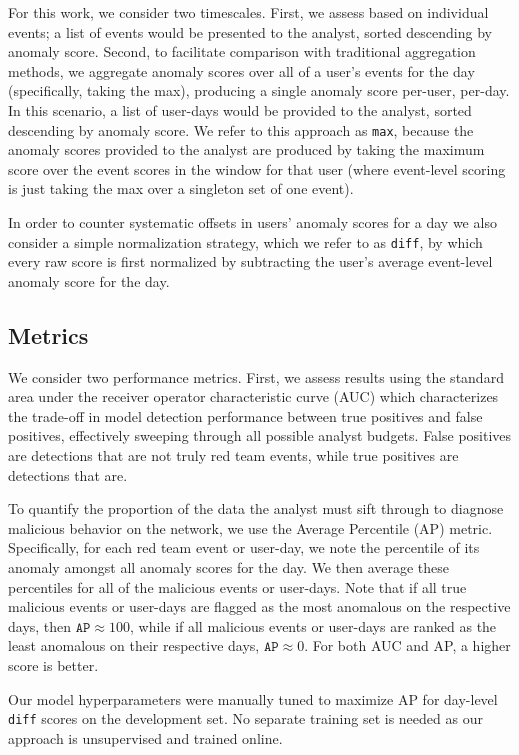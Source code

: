 \documentclass[letterpaper]{article} %
\begin{document}
For this work, we consider two timescales.  First, we assess based on individual events; a list of events would be presented to the analyst, sorted  descending by anomaly score. Second, to facilitate comparison with traditional aggregation methods, we aggregate anomaly scores over all of a user's events for the day (specifically, taking the max), producing a single anomaly score per-user, per-day.  In this scenario, a list of user-days would be provided to the analyst, sorted descending by anomaly score.  We refer to this approach as \verb|max|, because the anomaly scores provided to the analyst are produced by taking the maximum score over the event scores in the window for that user (where event-level scoring is just taking the max over a singleton set of one event).

 In order to counter systematic offsets in users' anomaly scores for a day we also consider a simple normalization strategy, which we refer to as \verb|diff|, by which every raw score is first normalized by subtracting the user's average event-level anomaly score for the day.

\subsection{Metrics}
We consider two performance metrics.
First, we assess results using the standard area under the receiver operator characteristic  curve (AUC) which characterizes the trade-off in model detection performance between true positives and false positives, effectively sweeping through all possible analyst budgets.
False positives are detections that are not truly red team events, while true positives are detections that are.

To quantify the proportion of the data the analyst must sift through to diagnose malicious behavior on the network, we use the Average Percentile (AP) metric.
Specifically, for each red team event or user-day, we note the percentile of its anomaly amongst all anomaly scores for the day.
We then average these percentiles for all of the malicious events or user-days.
Note that if all true malicious events or user-days are flagged as the most anomalous on the respective days, then $\texttt{AP} \approx 100$, while if all malicious events or user-days are ranked as the least anomalous on their respective days, $\texttt{AP} \approx 0$.
For both AUC and AP, a higher score is better.

Our model hyperparameters were manually tuned to maximize AP for day-level \texttt{diff} scores on the development set.  No separate training set is needed as our approach is unsupervised and trained online.
\end{document}
